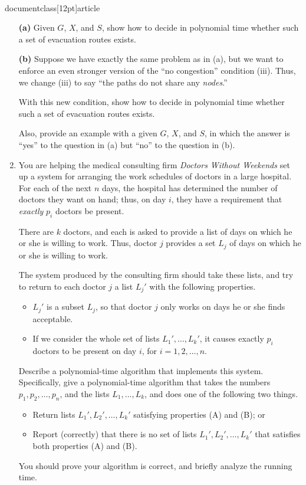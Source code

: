 \\documentclass[12pt]{article}
\begin{document}
\begin{enumerate}
{\bf (a)} Given $G$, $X$, and $S$, show how to decide in
polynomial time whether such a set of evacuation routes exists.

\vskip 0.1in
{\bf (b)} Suppose we have exactly the same problem as in (a),
but we want to enforce an even stronger version of
the ``no congestion'' condition (iii).
Thus, we change (iii) to say
``the paths do not share any {\em nodes}.''

With this new condition, show how to decide in
polynomial time whether such a set of evacuation routes exists.

Also, provide an example with a given $G$, $X$, and $S$, in which
the answer is ``yes'' to the question in (a) but ``no''
to the question in (b).





\item 

You are helping the medical consulting firm
{\em Doctors Without Weekends} set up a system
for arranging the work schedules of doctors in a large hospital.
For each of the next $n$ days, the hospital has
determined the number of doctors they want on hand;
thus, on day $i$, they have a requirement that
{\em exactly} $p_i$ doctors be present.

There are $k$ doctors, and each is asked to provide
a list of days on which he or she is willing to work.
Thus, doctor $j$ provides a set $L_j$ of days
on which he or she is willing to work.

The system produced by the consulting firm should
take these lists, %
and try to return to each doctor $j$ a
list $L_j'$ with the following properties.
\begin{itemize}
\item[(A)] $L_j'$ is a subset $L_j$, so that doctor $j$
only works on days he or she finds acceptable.
\item[(B)] If we consider the whole set of lists $L_1', \ldots, L_k'$,
it causes exactly $p_i$ doctors to be present on day $i$,
for $i = 1, 2, \ldots, n$.
\end{itemize}

\bigskip
{} 
Describe a polynomial-time algorithm that implements
this system.
Specifically, give a polynomial-time algorithm that takes the
numbers $p_1, p_2, \ldots, p_n$,
and the lists $L_1, \ldots, L_k$,
and does one of the following two things.
\begin{itemize}
\item Return lists $L_1', L_2', \ldots, L_k'$
satisfying properties (A) and (B); or
\item Report (correctly) that there is no
set of lists $L_1', L_2', \ldots, L_k'$
that satisfies both properties (A) and (B).
\end{itemize}
You should prove your algorithm is correct, and
briefly analyze the running time.


\end{enumerate}
\end{document}
